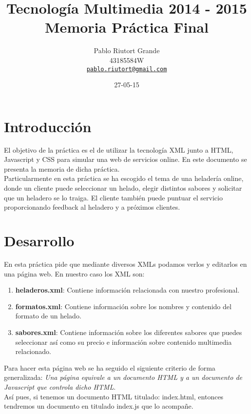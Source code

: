 \documentclass[11pt,a4paper]{article}
\author{Pablo Riutort Grande\\ 43185584W\\ \href{mailto:pablo.riutort@gmail.com}{\nolinkurl{pablo.riutort@gmail.com} }}
\title{\Huge{Tecnología Multimedia 2014 - 2015}\\\vspace{1cm} \Huge{\textbf{Memoria Práctica Final}}}
\date{27-05-15}
\begin{document}
\maketitle
\pagebreak

\tableofcontents
\pagebreak

\section{Introducción}
El objetivo de la práctica es el de utilizar la tecnología XML junto a HTML, Javascript y CSS para simular una web de servicios online. En este documento se presenta la memoria de dicha práctica.\\
Particularmente en esta práctica se ha escogido el tema de una heladería online, donde un cliente puede seleccionar un helado, elegir distintos sabores y solicitar que un heladero se lo traiga. El cliente también puede puntuar el servicio proporcionando feedback al heladero y a próximos clientes.

\section{Desarrollo}
En esta práctica pide que mediante diversos XMLs podamos verlos y editarlos en una página web. En nuestro caso los XML son:
\begin{enumerate}
\item \textbf{heladeros.xml}: Contiene información relacionada con nuestro profesional.
\item \textbf{formatos.xml}: Contiene información sobre los nombres y contenido del formato de un helado.
\item \textbf{sabores.xml}: Contiene información sobre los diferentes sabores que puedes seleccionar así como su precio e información sobre contenido multimedia relacionado.
\end{enumerate}
Para hacer esta página web se ha seguido el siguiente criterio de forma generalizada: \textit{Una página equivale a un documento HTML y a un documento de Javascript que controla dicho HTML}.\\
Así pues, si tenemos un documento HTML titulado: index.html, entonces tendremos un documento en titulado index.js que lo acompañe.\\
\end{document}

